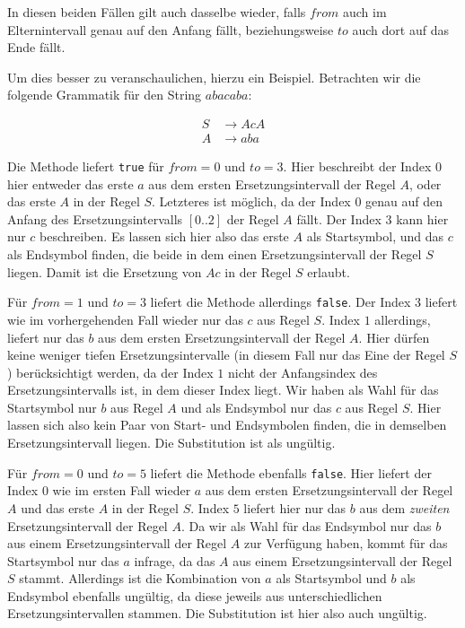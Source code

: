In diesen beiden Fällen gilt auch dasselbe wieder, falls $from$ auch im Elternintervall genau auf den Anfang fällt, beziehungsweise $to$ auch dort auf das Ende fällt.

Um dies besser zu veranschaulichen, hierzu ein Beispiel. Betrachten wir die folgende Grammatik für den String $abacaba$:

\begin{align*}
    S &\rightarrow AcA\\
    A &\rightarrow aba
\end{align*}

Die Methode liefert \texttt{true} für $from=0$ und $to=3$. Hier beschreibt der Index $0$ hier entweder das erste $a$ aus dem ersten Ersetzungsintervall der Regel $A$, oder das erste $A$ in der Regel $S$. Letzteres ist möglich, da der Index $0$ genau auf den Anfang des Ersetzungsintervalls $[0..2]$ der Regel $A$ fällt. Der Index $3$ kann hier nur $c$ beschreiben.
Es lassen sich hier also das erste $A$ als Startsymbol, und das $c$ als Endsymbol finden, die beide in dem einen Ersetzungsintervall der Regel $S$ liegen. Damit ist die Ersetzung von $Ac$ in der Regel $S$ erlaubt.

Für $from=1$ und $to=3$ liefert die Methode allerdings \texttt{false}. Der Index $3$ liefert wie im vorhergehenden Fall wieder nur das $c$ aus Regel $S$.
Index $1$ allerdings, liefert nur das $b$ aus dem ersten Ersetzungsintervall der Regel $A$. Hier dürfen keine weniger tiefen Ersetzungsintervalle (in diesem Fall nur das Eine der Regel $S$) berücksichtigt werden, da der Index $1$ nicht der Anfangsindex des Ersetzungsintervalls ist, in dem dieser Index liegt.
Wir haben als Wahl für das Startsymbol nur $b$ aus Regel $A$ und als Endsymbol nur das $c$ aus Regel $S$. Hier lassen sich also kein Paar von Start- und Endsymbolen finden, die in demselben Ersetzungsintervall liegen. Die Substitution ist als ungültig.

Für $from=0$ und $to=5$ liefert die Methode ebenfalls \texttt{false}. Hier liefert der Index $0$ wie im ersten Fall wieder $a$ aus dem ersten Ersetzungsintervall der Regel $A$ und das erste $A$ in der Regel $S$. Index $5$ liefert hier nur das $b$ aus dem \emph{zweiten} Ersetzungsintervall der Regel $A$. 
Da wir als Wahl für das Endsymbol nur das $b$ aus einem Ersetzungsintervall der Regel $A$ zur Verfügung haben, kommt für das Startsymbol nur das $a$ infrage, da das $A$ aus einem Ersetzungsintervall der Regel $S$ stammt.
Allerdings ist die Kombination von $a$ als Startsymbol und $b$ als Endsymbol ebenfalls ungültig, da diese jeweils aus unterschiedlichen Ersetzungsintervallen stammen.
Die Substitution ist hier also auch ungültig.

